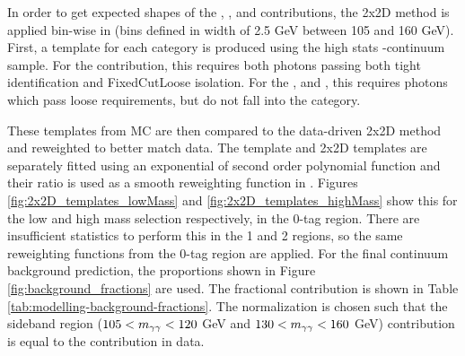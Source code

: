 In order to get expected shapes of the \yy, \yj, \jy and \jj contributions, the 2x2D method is applied bin-wise in \myy (bins defined in width of 2.5 GeV between 105 and 160 GeV). First, a template for each category is produced using the high stats \yy-continuum sample. For the \yy contribution, this requires both photons passing both tight identification and FixedCutLoose isolation. For the \yj, \jy and \jj, this requires photons which pass loose requirements, but do not fall into the \yy category.

These templates from \gls{MC} are then compared to the data-driven 2x2D method and reweighted to better match data. The template and 2x2D templates are separately fitted using an exponential of second order polynomial function and their ratio is used as a smooth reweighting function in \myy. Figures \ref{fig:2x2D_templates_lowMass} and \ref{fig:2x2D_templates_highMass} show this for the low and high mass selection respectively, in the 0-tag region. There are insufficient statistics to perform this in the 1 and 2 \btag regions, so the same reweighting functions from the 0-tag region are applied. For the final continuum \yy background prediction, the proportions shown in Figure \ref{fig:background_fractions} are used. The fractional contribution is shown in Table \ref{tab:modelling-background-fractions}. The normalization is chosen such that the sideband region ($105 < m_{\gamma\gamma} < 120$ GeV and $130 < m_{\gamma\gamma} <160$ GeV) contribution is equal to the contribution in data.

